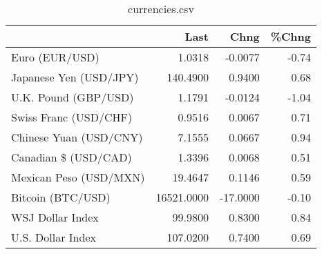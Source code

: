 \documentclass{article}%
\begin{document}
%


\begin{table}[htbp]%
\caption{currencies.csv}%
\centering%
\begin{adjustbox}{width=1\textwidth}%
\begin{tabular}{lrrr}
\toprule
                       &       Last &     Chng &  \%Chng \\
\midrule
        Euro (EUR/USD) &     1.0318 &  -0.0077 &  -0.74 \\
Japanese Yen (USD/JPY) &   140.4900 &   0.9400 &   0.68 \\
  U.K. Pound (GBP/USD) &     1.1791 &  -0.0124 &  -1.04 \\
 Swiss Franc (USD/CHF) &     0.9516 &   0.0067 &   0.71 \\
Chinese Yuan (USD/CNY) &     7.1555 &   0.0667 &   0.94 \\
  Canadian \$ (USD/CAD) &     1.3396 &   0.0068 &   0.51 \\
Mexican Peso (USD/MXN) &    19.4647 &   0.1146 &   0.59 \\
     Bitcoin (BTC/USD) & 16521.0000 & -17.0000 &  -0.10 \\
      WSJ Dollar Index &    99.9800 &   0.8300 &   0.84 \\
     U.S. Dollar Index &   107.0200 &   0.7400 &   0.69 \\
\bottomrule
\end{tabular}
%
\end{adjustbox}%
\end{table}

%
\end{document}
